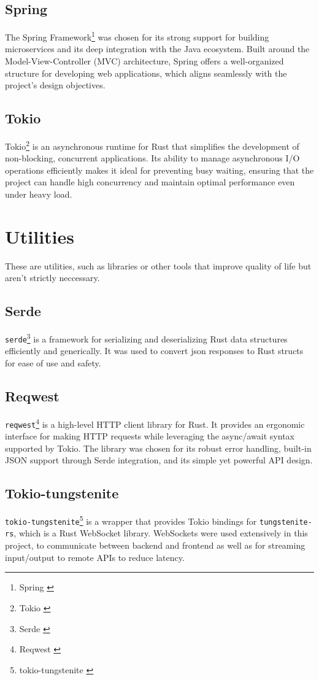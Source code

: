 \subsection{Spring}
The Spring Framework\footnote{Spring \cite{spring}} was chosen for its
strong support for building microservices
and its deep integration with the Java ecosystem.
Built around the Model-View-Controller (MVC) architecture,
Spring offers a well-organized structure
for developing web applications, which aligns seamlessly with
the project's design objectives.

\subsection{Tokio}
Tokio\footnote{Tokio \cite{tokio}} is an asynchronous runtime for Rust
that simplifies the development of non-blocking, concurrent applications.
Its ability to manage asynchronous I/O operations efficiently makes it
ideal for preventing busy waiting,
ensuring that the project can handle high concurrency and maintain
optimal performance even under heavy load.

\section{Utilities}
These are utilities, such as libraries or other tools that improve quality of life but aren't strictly neccessary.

\subsection{Serde}
\texttt{serde}\footnote{Serde \cite{serde}} is a framework for serializing and deserializing Rust data structures efficiently and generically.
It was used to convert json responses to Rust structs for ease of use and safety.

\subsection{Reqwest}
\texttt{reqwest}\footnote{Reqwest \cite{reqwest}} is a high-level HTTP client library for Rust.
It provides an ergonomic interface for making HTTP requests while leveraging the async/await syntax supported by Tokio.
The library was chosen for its robust error handling, built-in JSON support through Serde integration, and its simple yet powerful API design.

\subsection{Tokio-tungstenite}
\texttt{tokio-tungstenite}\footnote{tokio-tungstenite \cite{tokio-tungstenite}} is a wrapper that provides Tokio bindings for \texttt{tungstenite-rs},
which is a Rust WebSocket library. WebSockets were used extensively in this project, to communicate between backend and frontend as well as
for streaming input/output to remote APIs to reduce latency.


